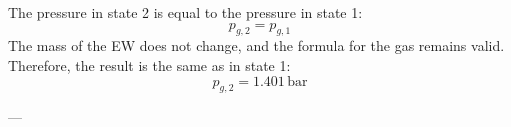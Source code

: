 The pressure in state 2 is equal to the pressure in state 1:  
\[
p_{g,2} = p_{g,1}
\]  
The mass of the EW does not change, and the formula for the gas remains valid. Therefore, the result is the same as in state 1:  
\[
p_{g,2} = 1.401 \, \text{bar}
\]  

---